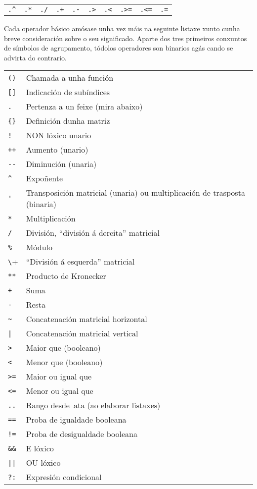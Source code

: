 \begin{center}
\begin{tabular}{cccccccccc}
\verb|.^| & \texttt{.*} & \texttt{./} & \texttt{.+} &
 \texttt{.-} & \verb|.>| & \verb|.<| & \verb|.>=| &
 \verb|.<=| & \texttt{.=} \\
\end{tabular}
\end{center}

Cada operador básico amósase unha vez máis na seguinte listaxe xunto cunha
breve consideración sobre o seu significado. Aparte dos tres primeiros
conxuntos de símbolos de agrupamento, tódolos operadores son binarios agás
cando se advirta do contrario.

\begin{longtable}{ll}
\verb|()| & Chamada a unha función \\
\verb|[]|  & Indicación de subíndices \\
\texttt{.} & Pertenza a un feixe (mira abaixo) \\
\verb|{}|  & Definición dunha matriz \\
\texttt{!} & NON lóxico unario \\
\texttt{++} & Aumento (unario) \\
\verb|--| & Diminución (unaria) \\
\verb|^|  & Expoñente \\
\verb|'|  & Transposición matricial (unaria) ou multiplicación de trasposta (binaria) \\
\texttt{*} & Multiplicación \\
\texttt{/} & División, ``división á dereita'' matricial \\
\texttt{\%} & Módulo \\
\verb+\+    & ``División á esquerda'' matricial \\
\texttt{**} & Producto de Kronecker \\
\texttt{+} & Suma \\
\texttt{-} & Resta \\
\verb|~| & Concatenación matricial horizontal \\
\verb+|+ & Concatenación matricial vertical \\
\verb|>| & Maior que (booleano) \\
\verb|<| & Menor que (booleano) \\
\verb|>=| & Maior ou igual que \\
\verb|<=| & Menor ou igual que \\
\texttt{..} & Rango desde--ata (ao elaborar listaxes) \\
\texttt{==} & Proba de igualdade booleana \\
\texttt{!=} & Proba de desigualdade booleana \\
\verb|&&| & E lóxico \\
\verb+||+ & OU lóxico \\
\texttt{?:} & Expresión condicional \\
\end{longtable}

